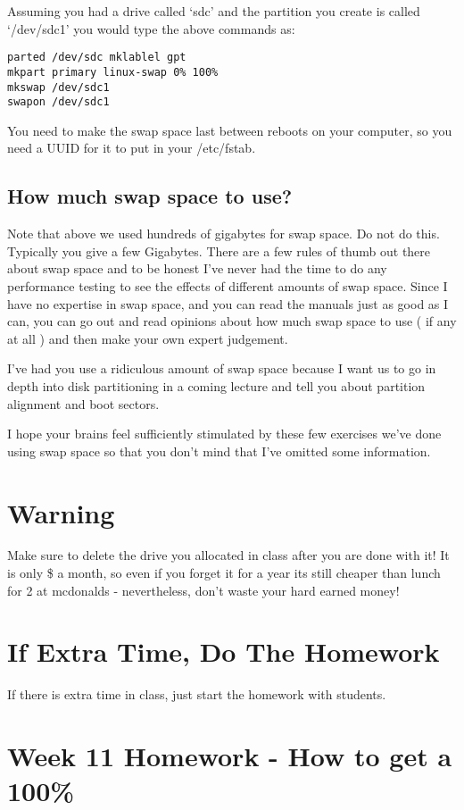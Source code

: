 \documentclass[10pt]{article}
\begin{document}
Assuming you had a drive called `sdc' and the partition you create is called
`/dev/sdc1' you would type the above commands as:

\begin{lstlisting}
parted /dev/sdc mklablel gpt
mkpart primary linux-swap 0% 100%
mkswap /dev/sdc1
swapon /dev/sdc1
\end{lstlisting}

You need to make the swap space last between reboots on your computer, so you
need a UUID for it to put in your /etc/fstab.


\subsection{How much swap space to use?} 

Note that above we used hundreds of
gigabytes for swap space. Do not do this. Typically you give a few Gigabytes.
There are a few rules of thumb out there about swap space and to be honest I've
never had the time to do any performance testing to see the effects of different
amounts of swap space. Since I have no expertise in swap space, and you can read
the manuals just as good as I can, you can go out and read opinions about how
much swap space to use ( if any at all ) and then make your own expert
judgement.


I've had you use a ridiculous amount of swap space because I want us to go in
depth into disk partitioning in a coming lecture and tell you about partition
alignment and boot sectors. 

I hope your brains feel sufficiently stimulated by these few exercises we've
done using swap space so that you don't mind that I've omitted some information.

\section{Warning}
Make sure to delete the drive you allocated in class after you are done with it!
It is only \$ a month, so even if you forget it for a year its still cheaper
than lunch for 2 at mcdonalds - nevertheless, don't waste your hard earned
money!

\section{If Extra Time, Do The Homework}
 If there is extra time in class, just
start the homework with students.


\section{Week 11 Homework - How to get a 100\%}
\end{document}
